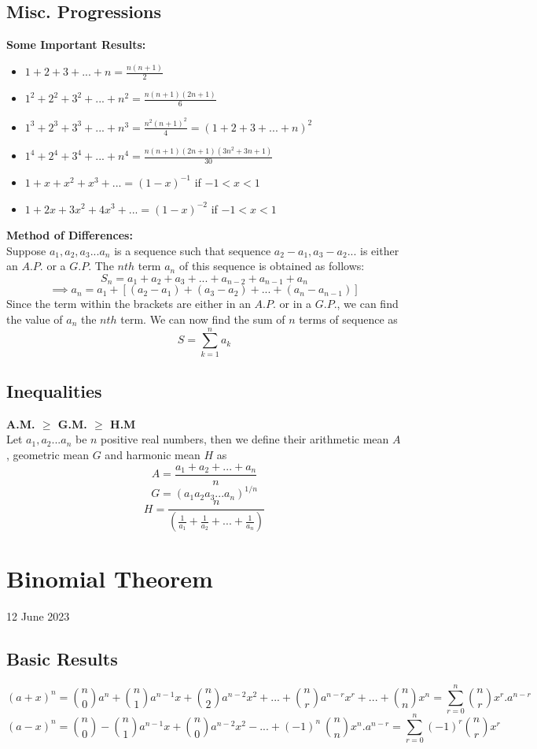 \documentclass[12pt]{article}
\begin{document}
\subsection{Misc. Progressions}
\textbf{Some Important Results:}
\begin{itemize}
\item $1+2+3+...+n=\frac{n(n+1)}{2}$
\item $1^2+2^2+3^2+...+n^2=\frac{n(n+1)(2n+1)}{6}$
\item $1^3+2^3+3^3+...+n^3=\frac{n^2(n+1)^2}{4}=(1+2+3+...+n)^2$
\item $1^4+2^4+3^4+...+n^4=\frac{n(n+1)(2n+1)(3n^2+3n+1)}{30}$
\item $1+x+x^2+x^3+...=(1-x)^{-1}$ if $-1<x<1$
\item $1+2x+3x^2+4x^3+...=(1-x)^{-2}$ if $-1<x<1$
\end{itemize}
\textbf{Method of Differences:}\\
Suppose $a_1,a_2,a_3...a_n$ is a sequence such that sequence $a_2-a_1,a_3-a_2...$ is either an $A.P.$ or a $G.P.$ The $nth$ term $a_n$ of this sequence is obtained as follows:
$$S_n=a_1+a_2+a_3+...+a_{n-2}+a_{n-1}+a_n$$
$$\implies a_n=a_1+[(a_2-a_1)+(a_3-a_2)+...+(a_n-a_{n-1})]$$
Since the term within the brackets are either in an $A.P.$ or in a $G.P.$, we can find the value of $a_n$ the $nth$ term. We can now find the sum of $n$ terms of sequence as $$S=\sum_{k=1}^{n} a_k$$
\subsection{Inequalities}
\textbf{A.M. $\ge$ G.M. $\ge$ H.M} \\
Let $a_1,a_2...a_n$ be $n$ positive real numbers, then we define their arithmetic mean $A$, geometric mean $G$ and harmonic mean $H$ as 
$$A=\frac{a_1+a_2+...+a_n}{n}$$ $$G=(a_1 a_2 a_3 ... a_n)^{1/n}$$
$$H=\frac{n}{(\frac{1}{a_1}+\frac{1}{a_2}+...+\frac{1}{a_n})}$$
\section{Binomial Theorem}
12 June 2023
\subsection{Basic Results}
$$(a+x)^n=\binom{n}{0}a^n+ \binom{n}{1}a^{n-1}x+\binom{n}{2}a^{n-2}x^2+...+ \binom{n}{r}a^{n-r}x^r+...+ \binom{n}{n}x^n=\sum_{r=0}^{n}\binom{n}{r}x^r. a^{n-r} $$
$$(a-x)^n=\binom{n}{0}-\binom{n}{1}a^{n-1}x+\binom{n}{0}a^{n-2}x^2-...+(-1)^n \medspace \binom{n}{n}x^n.a^{n-r}=\sum_{r=0}^{n}(-1)^r \binom{n}{r} x^r$$
\end{document}
